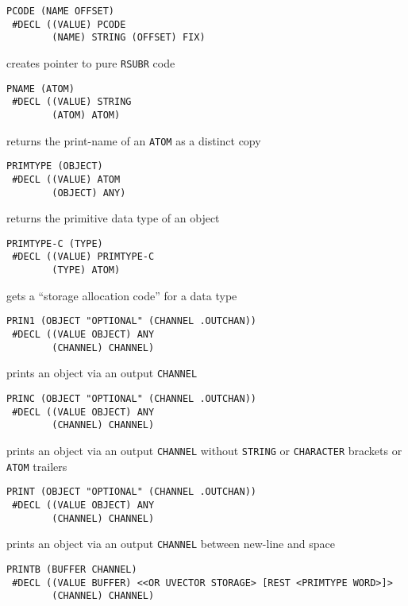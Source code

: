 \documentclass[a4paper,]{article}
\begin{document}
\begin{verbatim}
PCODE (NAME OFFSET)
 #DECL ((VALUE) PCODE
        (NAME) STRING (OFFSET) FIX)
\end{verbatim}

creates pointer to pure \texttt{RSUBR} code

\begin{verbatim}
PNAME (ATOM)
 #DECL ((VALUE) STRING
        (ATOM) ATOM)
\end{verbatim}

returns the print-name of an \texttt{ATOM} as a distinct copy

\begin{verbatim}
PRIMTYPE (OBJECT)
 #DECL ((VALUE) ATOM
        (OBJECT) ANY)
\end{verbatim}

returns the primitive data type of an object

\begin{verbatim}
PRIMTYPE-C (TYPE)
 #DECL ((VALUE) PRIMTYPE-C
        (TYPE) ATOM)
\end{verbatim}

gets a ``storage allocation code'' for a data type

\begin{verbatim}
PRIN1 (OBJECT "OPTIONAL" (CHANNEL .OUTCHAN))
 #DECL ((VALUE OBJECT) ANY
        (CHANNEL) CHANNEL)
\end{verbatim}

prints an object via an output \texttt{CHANNEL}

\begin{verbatim}
PRINC (OBJECT "OPTIONAL" (CHANNEL .OUTCHAN))
 #DECL ((VALUE OBJECT) ANY
        (CHANNEL) CHANNEL)
\end{verbatim}

prints an object via an output \texttt{CHANNEL} without \texttt{STRING} or \texttt{CHARACTER} brackets or \texttt{ATOM}
trailers

\begin{verbatim}
PRINT (OBJECT "OPTIONAL" (CHANNEL .OUTCHAN))
 #DECL ((VALUE OBJECT) ANY
        (CHANNEL) CHANNEL)
\end{verbatim}

prints an object via an output \texttt{CHANNEL} between new-line and space

\begin{verbatim}
PRINTB (BUFFER CHANNEL)
 #DECL ((VALUE BUFFER) <<OR UVECTOR STORAGE> [REST <PRIMTYPE WORD>]>
        (CHANNEL) CHANNEL)
\end{verbatim}
\end{document}
